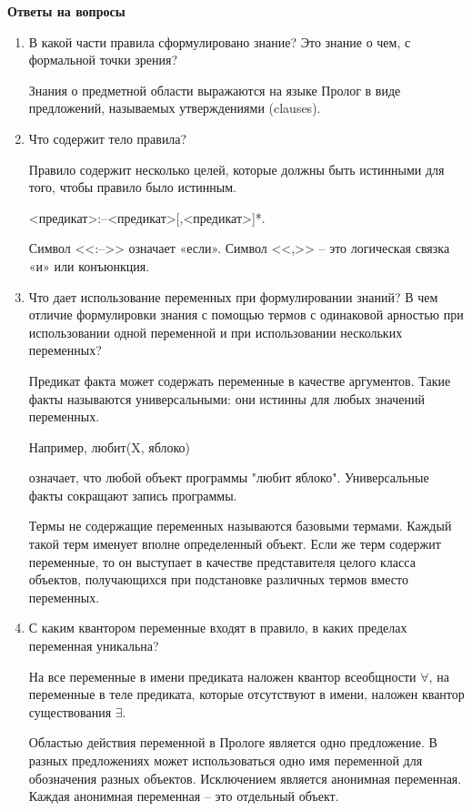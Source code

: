 \documentclass[a4paper,14pt]{extreport} %
\begin{document}
\hfill

\textbf{Ответы на вопросы}

\begin{enumerate} 
\item В какой части правила сформулировано знание? Это знание о чем, с формальной точки зрения?

Знания о предметной области выражаются на языке Пролог в виде предложений, называемых утверждениями (clauses). 

\item Что содержит тело правила?

Правило содержит несколько целей, которые должны быть истинными для того, чтобы правило было истинным.

<предикат>:–<предикат>[,<предикат>]*.

Символ <<:–>> означает «если». 
Символ <<,>> -- это логическая связка «и» или конъюнкция. 

\item Что дает использование переменных при формулировании знаний? В чем отличие формулировки знания с помощью термов с одинаковой арностью при использовании одной переменной и при использовании нескольких переменных? 

Предикат факта может содержать переменные в качестве аргументов. Такие факты называются универсальными: они истинны для любых значений переменных. 

Например,
любит(X, яблоко)

означает, что любой объект программы "любит яблоко". Универсальные факты сокращают запись программы.

Термы не содержащие переменных называются базовыми термами. Каждый такой терм именует вполне определенный объект. Если же терм содержит переменные, то он выступает в качестве представителя целого класса объектов, получающихся при подстановке различных термов вместо переменных.

\item С каким квантором переменные входят в правило, в каких пределах переменная уникальна? 

На все переменные в имени предиката наложен квантор всеобщности $\forall$, на переменные в теле предиката, которые отсутствуют в имени, наложен квантор существования $\exists$.

Областью действия переменной в Прологе является одно предложение. В разных предложениях может использоваться одно имя переменной для обозначения разных объектов. Исключением является анонимная переменная. Каждая анонимная переменная -- это отдельный объект.


\end{enumerate}
\end{document}
